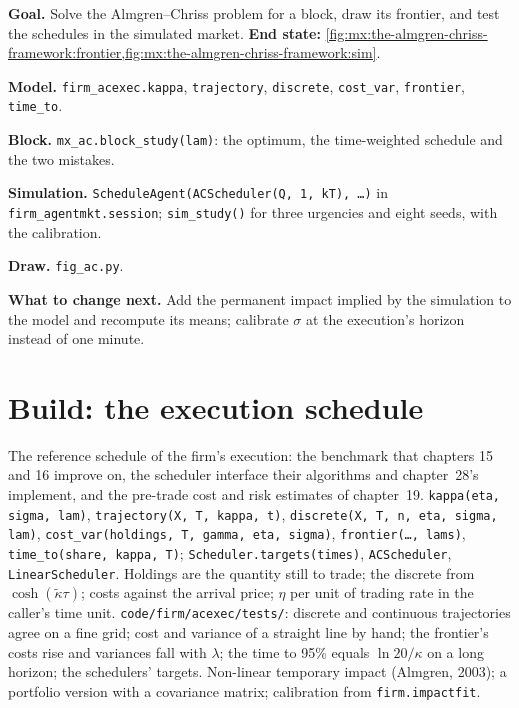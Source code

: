 \begin{tutorial}
\textbf{Goal.} Solve the Almgren--Chriss problem for a block, draw its frontier, and test the schedules in the simulated market.
\textbf{End state:} \cref{fig:mx:the-almgren-chriss-framework:frontier,fig:mx:the-almgren-chriss-framework:sim}.
\begin{tutsteps}
\item \textbf{Model.} \texttt{firm\_acexec.kappa}, \texttt{trajectory}, \texttt{discrete}, \texttt{cost\_var}, \texttt{frontier}, \texttt{time\_to}.
\item \textbf{Block.} \texttt{mx\_ac.block\_study(lam)}: the optimum, the time-weighted schedule and the two mistakes.
\item \textbf{Simulation.} \texttt{ScheduleAgent(ACScheduler(Q, 1, kT), \dots)} in \texttt{firm\_agentmkt.session}; \texttt{sim\_study()} for three
urgencies and eight seeds, with the calibration.
\item \textbf{Draw.} \texttt{fig\_ac.py}.
\end{tutsteps}
\textbf{What to change next.} Add the permanent impact implied by the simulation to the model and recompute its means; calibrate $\sigma$ at the
execution's horizon instead of one minute.
\end{tutorial}

\section{Build: the execution schedule}\label{bld:mx:the-almgren-chriss-framework:acexec}

\begin{build}
 The reference schedule of the firm's execution: the benchmark that chapters 15 and 16 improve on, the scheduler interface their
algorithms and chapter~28's implement, and the pre-trade cost and risk estimates of chapter~19.
 \texttt{kappa(eta, sigma, lam)}, \texttt{trajectory(X, T, kappa, t)}, \texttt{discrete(X, T, n, eta, sigma, lam)},
\texttt{cost\_var(holdings, T, gamma, eta, sigma)}, \texttt{frontier(\dots, lams)}, \texttt{time\_to(share, kappa, T)}; \texttt{Scheduler.targets(times)},
\texttt{ACScheduler}, \texttt{LinearScheduler}.
 Holdings are the quantity still to trade; the discrete  from $\cosh(\tilde\kappa\tau)$; costs against the arrival price; $\eta$
per unit of trading rate in the caller's time unit.
 \texttt{code/firm/acexec/tests/}: discrete and continuous trajectories agree on a fine grid; cost and variance of a straight line
by hand; the frontier's costs rise and variances fall with $\lambda$; the time to 95\% equals $\ln 20/\kappa$ on a long horizon; the schedulers' targets.
 Non-linear temporary impact (Almgren, 2003); a portfolio version with a covariance matrix; calibration from \texttt{firm.impactfit}.
\end{build}

